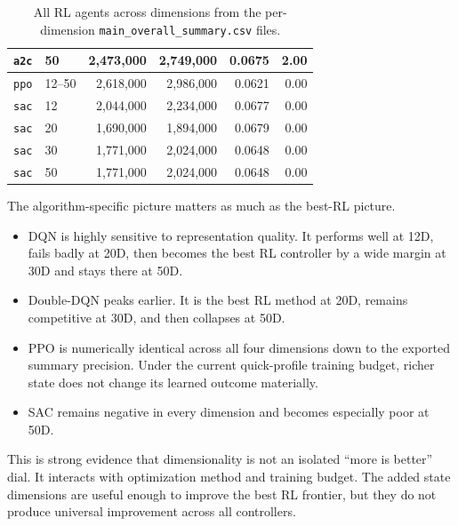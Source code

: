 \documentclass[12pt,a4paper]{article}
\begin{document}
\begin{table}[H]
\begin{tabular}{l l r r r r}
        \texttt{a2c}         & 50        & 2{,}473{,}000 & 2{,}749{,}000 & 0.0675       & 2.00                 \\
        \midrule
        \texttt{ppo}         & 12--50    & 2{,}618{,}000 & 2{,}986{,}000 & 0.0621       & 0.00                 \\
        \midrule
        \texttt{sac}         & 12        & 2{,}044{,}000 & 2{,}234{,}000 & 0.0677       & 0.00                 \\
        \texttt{sac}         & 20        & 1{,}690{,}000 & 1{,}894{,}000 & 0.0679       & 0.00                 \\
        \texttt{sac}         & 30        & 1{,}771{,}000 & 2{,}024{,}000 & 0.0648       & 0.00                 \\
        \texttt{sac}         & 50        & 1{,}771{,}000 & 2{,}024{,}000 & 0.0648       & 0.00                 \\
        \bottomrule
    \end{tabular}
    \caption{All RL agents across dimensions from the per-dimension \texttt{main\_overall\_summary.csv} files.}
    \label{tab:en-rl-all}
\end{table}

The algorithm-specific picture matters as much as the best-RL picture.
\begin{itemize}[leftmargin=*]
    \item DQN is highly sensitive to representation quality. It performs well at 12D, fails badly at 20D, then becomes the best RL controller by a wide margin at 30D and stays there at 50D.
    \item Double-DQN peaks earlier. It is the best RL method at 20D, remains competitive at 30D, and then collapses at 50D.
    \item PPO is numerically identical across all four dimensions down to the exported summary precision. Under the current quick-profile training budget, richer state does not change its learned outcome materially.
    \item SAC remains negative in every dimension and becomes especially poor at 50D.
\end{itemize}

This is strong evidence that dimensionality is not an isolated ``more is better'' dial. It interacts with optimization method and training budget. The added state dimensions are useful enough to improve the best RL frontier, but they do not produce universal improvement across all controllers.
\end{document}
